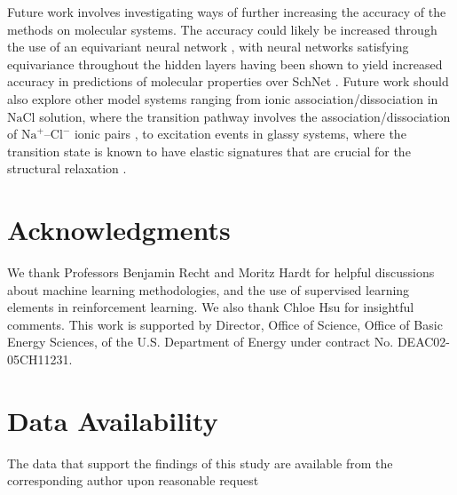 \documentclass{article}
\numberwithin{equation}{section}
\theoremstyle{definition}
\theoremstyle{remark}
\begin{document}
Future work involves investigating ways of  further increasing the accuracy of the methods on molecular systems.
The accuracy could likely be increased through the use of an equivariant neural network \cite{thomas2018tensor}, with neural networks satisfying equivariance throughout the hidden layers having been shown to yield increased accuracy in predictions of molecular properties over SchNet \cite{batzner2021e3equivariant}.
Future work should also explore other model systems ranging from ionic association/dissociation in $\mathrm{Na Cl}$ solution, where the transition pathway involves the association/dissociation of $\mathrm{Na}^+$--$\mathrm{Cl}^-$ ionic pairs \cite{Laio12562,geissler1999kinetic,geissler2001autoionization,ballard2012toward}, to excitation events in glassy systems, where the transition state is known to have elastic signatures that are crucial for the structural relaxation \cite{hasyim2021theory}. 



\section*{Acknowledgments}

We thank Professors Benjamin Recht and Moritz Hardt for helpful discussions about machine learning methodologies, and the use of supervised learning elements in reinforcement learning. 
We also thank Chloe Hsu for insightful comments.
This work is supported by Director, Office of Science, Office of Basic Energy Sciences, of the U.S. Department of Energy under contract No. DEAC02-05CH11231.

\section*{Data Availability}
The data that support the findings of this study are available
from the corresponding author upon reasonable request

\printbibliography

\newpage 

\appendix
\end{document}
